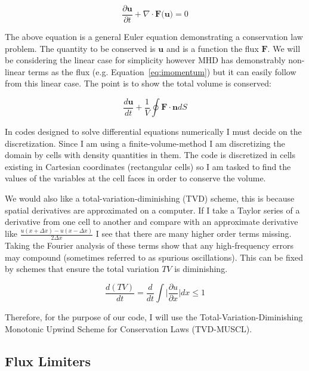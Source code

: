 \documentclass[12pt,upcase]{umlthesis}
\begin{document}
\begin{equation}\label{eq:geneuler}
	\frac{\partial \textbf{u}}{\partial t} + \nabla \cdot \textbf{F(u)} = 0
\end{equation}

The above equation is a general Euler equation demonstrating a conservation law problem. The quantity to be conserved is $\textbf{u}$ and is a function the flux $\textbf{F}$. We will be considering the linear case for simplicity however MHD has demonstrably non-linear terms as the flux (e.g. Equation~\ref{eq:imomentum}) but it can easily follow from this linear case. The point is to show the total volume is conserved:

\begin{equation}\label{eq:geneulerint}
	\frac{d\textbf{u}}{dt} + \frac{1}{V} \oint \textbf{F} \cdot \textbf{n} dS
\end{equation}

In codes designed to solve differential equations numerically I must decide on the discretization. Since I am using a finite-volume-method I am discretizing the domain by cells with density quantities in them. The code is discretized in cells existing in Cartesian coordinates (rectangular cells) so I am tasked to find the values of the variables at the cell faces in order to conserve the volume.

We would also like a total-variation-diminishing (TVD) scheme, this is because spatial derivatives are approximated on a computer. If I take a Taylor series of a derivative from one cell to another and compare with an approximate derivative like $\frac{u(x+\Delta x)-u(x-\Delta x)}{2\Delta x}$ I see that there are many higher order terms missing. Taking the Fourier analysis of these terms show that any high-frequency errors may compound (sometimes referred to as spurious oscillations). This can be fixed by schemes that ensure the total variation $TV$ is diminishing.

\begin{equation}\label{eq:tvd}
	\frac{d(TV)}{dt} = \frac{d}{dt} \int \lvert \frac{\partial u}{\partial x} \rvert dx \leq 1
\end{equation}

Therefore, for the purpose of our code, I will use the Total-Variation-Diminishing Monotonic Upwind Scheme for Conservation Laws (TVD-MUSCL).

\subsection{Flux Limiters}\label{sec:fluxlimiters}
\end{document}
